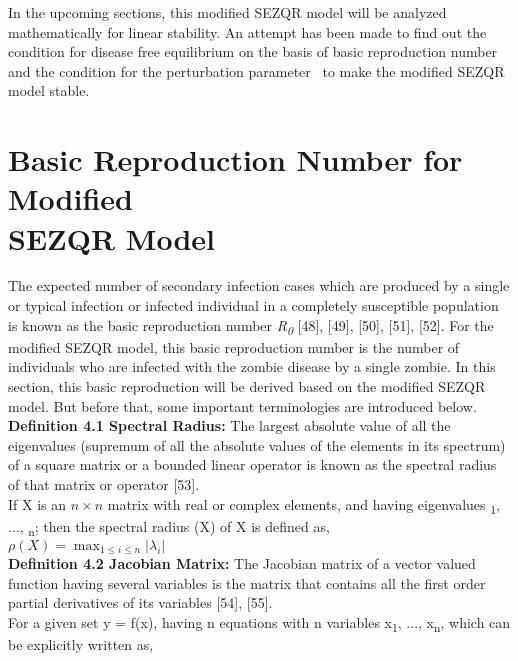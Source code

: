 In the upcoming sections, this modified SEZQR model will be analyzed mathematically for linear stability. An attempt has been made to find out the condition for disease free equilibrium on the basis of basic reproduction number and the condition for the perturbation parameter \textmu \ to make the modified SEZQR model stable.

\pagebreak
\section{Basic Reproduction Number for Modified \\SEZQR Model}

The expected number of secondary infection cases which are produced by a single or typical infection or infected individual in a completely susceptible population is known as the basic reproduction number \textit{R\textsubscript{0}} [48], [49], [50], [51], [52]. For the modified SEZQR model, this basic reproduction number is the number of individuals who are infected with the zombie disease by a single zombie. In this section, this basic reproduction will be derived based on the modified SEZQR model. But before that, some important terminologies are introduced below. \\

\textbf{Definition 4.1 Spectral Radius: } The largest absolute value of all the eigenvalues (supremum of all the absolute values of the elements in its spectrum) of a square matrix or a bounded linear operator is known as the spectral radius of that matrix or operator [53]. \\

\noindent If X is an $n\times n$ matrix with real or complex elements, and having eigenvalues \textlambda \textsubscript{1}, ..., \textlambda \textsubscript{n}; then the spectral radius \textrho (X) of X is defined as, \\
$
\rho(X)=\max _{1 \leq i \leq n}\left|\lambda_{i}\right|
$
\\

\textbf{Definition 4.2 Jacobian Matrix: } The Jacobian matrix of a vector valued function having several variables is the matrix that contains all the first order partial derivatives of its variables [54], [55]. \\

\noindent For a given set y = f(x), having n equations with n variables x\textsubscript{1}, ..., x\textsubscript{n}, which can be explicitly written as, \\

